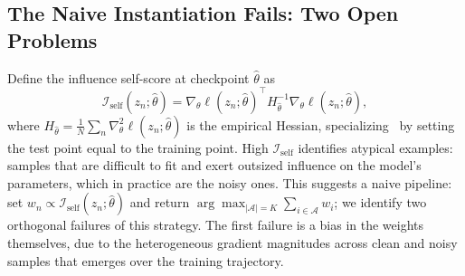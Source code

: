 \subsection{The Naive Instantiation Fails: Two Open Problems} \label{sec:52-research03-theory-failures}
\begin{foldable} %
    Define the influence self-score at checkpoint $\hat{\theta}$ as
    \begin{equation}
        \mathcal{I}_\text{self}(z_n; \hat{\theta}) = \nabla_\theta \ell(z_n; \hat{\theta})^\top H_{\hat{\theta}}^{-1} \nabla_\theta \ell(z_n; \hat{\theta}),
        \label{eq:influence-self}
    \end{equation}
    where $H_{\hat{\theta}} = \frac{1}{N}\sum_n \nabla^2_\theta \ell(z_n; \hat{\theta})$ is the empirical Hessian, specializing~\cite{koh2017understanding} by setting the test point equal to the training point.
    High $\mathcal{I}_\text{self}$ identifies atypical examples: samples that are difficult to fit and exert outsized influence on the model's parameters, which in practice are the noisy ones.
    This suggests a naive pipeline: set $w_n \propto \mathcal{I}_\text{self}(z_n; \hat{\theta})$ and return $\arg\max_{|\mathcal{A}|=K} \sum_{i \in \mathcal{A}} w_i$; we identify two orthogonal failures of this strategy.
    The first failure is a bias in the weights themselves, due to the heterogeneous gradient magnitudes across clean and noisy samples that emerges over the training trajectory.
\end{foldable}

